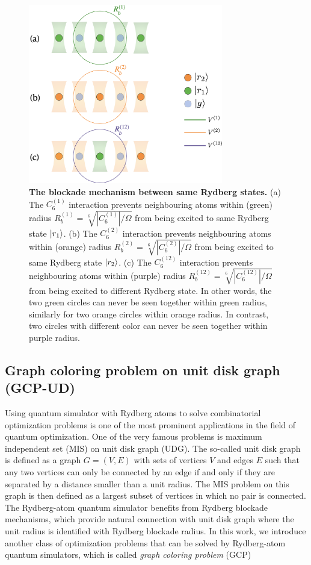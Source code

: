 \documentclass[%
 reprint,
nofootinbib,
 amsmath,amssymb,
 aps,
floatfix,
]{revtex4-2}
\begin{document}
\begin{figure}[ht!]
    \centering
    \includegraphics[width=8.5cm]{picture/Blockade_Mech.png}
    \caption{\textbf{The blockade mechanism between same Rydberg states.} (a) The $C^{(1)}_6$ interaction prevents neighbouring atoms within (green) radius $R^{(1)}_b = \sqrt[6]{|C^{(1)}_6|/\Omega}$ from being excited to same Rydberg state $\ket{r_1}$. (b) The $C^{(2)}_6$ interaction prevents neighbouring atoms within (orange) radius $R^{(2)}_b = \sqrt[6]{|C^{(2)}_6|/\Omega}$ from being excited to same Rydberg state $\ket{r_2}$. (c) The $C^{(12)}_6$ interaction prevents neighbouring atoms within (purple) radius $R^{(12)}_b = \sqrt[6]{|C^{(12)}_6|/\Omega}$ from being excited to different Rydberg state. In other words, the two green circles can never be seen together within green radius, similarly for two orange circles within orange radius. In contrast, two circles with different color can never be seen together within purple radius.}
    \label{fig:blockade}
\end{figure}


 
\subsection{Graph coloring problem on unit disk graph (GCP-UD)}

Using quantum simulator with Rydberg atoms to solve combinatorial optimization problems is one of the most prominent applications in the field of quantum optimization. One of the very famous problems is maximum independent set (MIS) on unit disk graph (UDG). The so-called unit disk graph is defined as a graph $G=(V,E)$ with sets of vertices $V$ and edges $E$ such that any two vertices can only be connected by an edge if and only if they are separated by a distance smaller than a unit radius. The MIS problem on this graph is then defined as a largest subset of vertices in which no pair is connected. The Rydberg-atom quantum simulator benefits from Rydberg blockade mechanisms, which provide natural connection with unit disk graph where the unit radius is identified with Rydberg blockade radius. In this work, we introduce another class of optimization problems that can be solved by Rydberg-atom quantum simulators, which is called \emph{graph coloring problem} (GCP)
\end{document}

